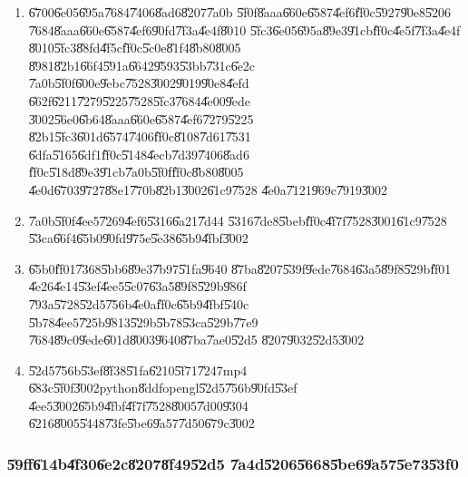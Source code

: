 \begin{enumerate}
\item \U{6700}\U{6e05}\U{695a}\U{7684}\U{7406}\U{8ad6}\U{8207}\U{7a0b}%
\U{5f0f}\U{8aaa}\U{660e}\U{6587}\U{4ef6}\U{ff0c}\U{5927}\U{90e8}\U{5206}%
\U{7684}\U{8aaa}\U{660e}\U{6587}\U{4ef6}\U{90fd}\U{7f3a}\U{4e4f}\U{8010}%
\U{5fc3}\U{6e05}\U{695a}\U{89e3}\U{91cb}\U{ff0c}\U{4e5f}\U{7f3a}\U{4e4f}%
\U{8010}\U{5fc3}\U{88fd}\U{4f5c}\U{ff0c}\U{5c0e}\U{81f4}\U{8b80}\U{8005}%
\U{8981}\U{82b1}\U{66f4}\U{591a}\U{6642}\U{9593}\U{53bb}\U{731c}\U{6e2c}%
\U{7a0b}\U{5f0f}\U{600e}\U{9ebc}\U{7528}\U{3002}\U{9019}\U{90e8}\U{4efd}%
\U{662f}\U{6211}\U{7279}\U{5225}\U{7528}\U{5fc3}\U{7684}\U{4e00}\U{9ede}%
\U{3002}\U{56e0}\U{6b64}\U{8aaa}\U{660e}\U{6587}\U{4ef6}\U{7279}\U{5225}%
\U{82b1}\U{5fc3}\U{601d}\U{6574}\U{7406}\U{ff0c}\U{8108}\U{7d61}\U{7531}%
\U{6dfa}\U{5165}\U{6df1}\U{ff0c}\U{5148}\U{4ecb}\U{7d39}\U{7406}\U{8ad6}%
\U{ff0c}\U{518d}\U{89e3}\U{91cb}\U{7a0b}\U{5f0f}\U{ff0c}\U{8b80}\U{8005}%
\U{4e0d}\U{6703}\U{9727}\U{88e1}\U{770b}\U{82b1}\U{3002}\U{61c9}\U{7528}%
\U{4e0a}\U{7121}\U{969c}\U{7919}\U{3002}

\item \U{7a0b}\U{5f0f}\U{4ee5}\U{7269}\U{4ef6}\U{5316}\U{6a21}\U{7d44}%
\U{5316}\U{7de8}\U{5beb}\U{ff0c}\U{4f7f}\U{7528}\U{3001}\U{61c9}\U{7528}%
\U{53ca}\U{66f4}\U{65b0}\U{90fd}\U{975e}\U{5e38}\U{65b9}\U{4fbf}\U{3002}

\item \U{65b0}\U{ff01}\U{7368}\U{5bb6}\U{89e3}\U{7b97}\U{51fa}\U{9640}%
\U{87ba}\U{8207}\U{539f}\U{9ede}\U{7684}\U{63a5}\U{89f8}\U{529b}\U{ff01}%
\U{4e26}\U{4e14}\U{53ef}\U{4ee5}\U{5c07}\U{63a5}\U{89f8}\U{529b}\U{986f}%
\U{793a}\U{5728}\U{52d5}\U{756b}\U{4e0a}\U{ff0c}\U{65b9}\U{4fbf}\U{540c}%
\U{5b78}\U{4ee5}\U{725b}\U{9813}\U{529b}\U{5b78}\U{53ca}\U{529b}\U{77e9}%
\U{7684}\U{89c0}\U{9ede}\U{601d}\U{8003}\U{9640}\U{87ba}\U{7ae0}\U{52d5}%
\U{8207}\U{9032}\U{52d5}\U{3002}

\item \U{52d5}\U{756b}\U{53ef}\U{8f38}\U{51fa}\U{6210}\U{5f71}\U{7247}mp4%
\U{683c}\U{5f0f}\U{3002}python\U{8ddf}opengl\U{52d5}\U{756b}\U{90fd}\U{53ef}%
\U{4ee5}\U{3002}\U{65b9}\U{4fbf}\U{4f7f}\U{7528}\U{8005}\U{7d00}\U{9304}%
\U{6216}\U{8005}\U{5448}\U{73fe}\U{5be6}\U{9a57}\U{7d50}\U{679c}\U{3002}
\end{enumerate}

\subsubsection{\U{59ff}\U{614b}\U{4f30}\U{6e2c}\U{8207}\U{8f49}\U{52d5}%
\U{7a4d}\U{5206}\U{5668}\U{5be6}\U{9a57}\U{5e73}\U{53f0}}

